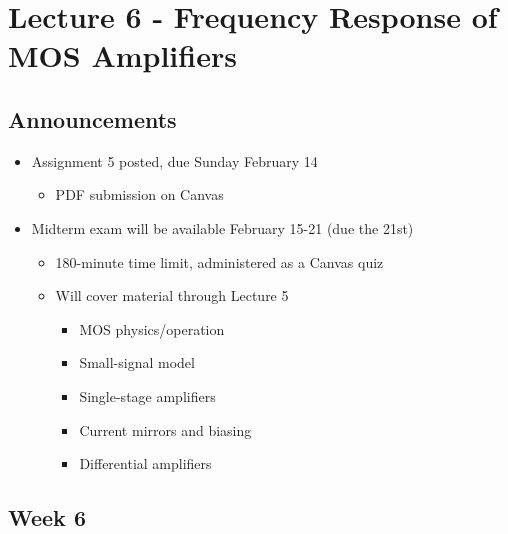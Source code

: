 \documentclass[11pt]{article}
\providecommand{\tightlist}{%
      \setlength{\itemsep}{0pt}\setlength{\parskip}{0pt}}
\begin{document}
    \hypertarget{lecture-6---frequency-response-of-mos-amplifiers}{%
\section{Lecture 6 - Frequency Response of MOS
Amplifiers}\label{lecture-6---frequency-response-of-mos-amplifiers}}

    \hypertarget{announcements}{%
\subsection{Announcements}\label{announcements}}

    \begin{itemize}
\tightlist
\item
  Assignment 5 posted, due Sunday February 14

  \begin{itemize}
  \tightlist
  \item
    PDF submission on Canvas
  \end{itemize}
\item
  Midterm exam will be available February 15-21 (due the 21st)

  \begin{itemize}
  \tightlist
  \item
    180-minute time limit, administered as a Canvas quiz
  \item
    Will cover material through Lecture 5

    \begin{itemize}
    \tightlist
    \item
      MOS physics/operation
    \item
      Small-signal model
    \item
      Single-stage amplifiers
    \item
      Current mirrors and biasing
    \item
      Differential amplifiers
    \end{itemize}
  \end{itemize}
\end{itemize}

    \hypertarget{week-6}{%
\subsection{Week 6}\label{week-6}}
\end{document}
